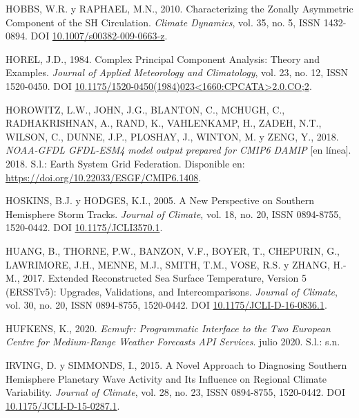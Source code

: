 \documentclass[12pt,oneside,a4paper]{reedthesis}
\newlength{\cslhangindent}
\newenvironment{CSLReferences}[2] %
 {%
  \setlength{\parindent}{0pt}
  \ifodd #1 \everypar{\setlength{\hangindent}{\cslhangindent}}\ignorespaces\fi
  \ifnum #2 > 0
  \setlength{\parskip}{#2\baselineskip}
  \fi
 }%
 {}
\begin{document}
\begin{CSLReferences}{1}{0}
\leavevmode{}%
HOBBS, W.R. y RAPHAEL, M.N., 2010. Characterizing the Zonally Asymmetric Component of the {SH} Circulation. \emph{Climate Dynamics}, vol. 35, no. 5, ISSN 1432-0894. DOI \href{https://doi.org/10.1007/s00382-009-0663-z}{10.1007/s00382-009-0663-z}.

\leavevmode{}%
HOREL, J.D., 1984. Complex {Principal Component Analysis}: {Theory} and {Examples}. \emph{Journal of Applied Meteorology and Climatology}, vol. 23, no. 12, ISSN 1520-0450. DOI \href{https://doi.org/10.1175/1520-0450(1984)023\%3C1660:CPCATA\%3E2.0.CO;2}{10.1175/1520-0450(1984)023\textless1660:CPCATA\textgreater2.0.CO;2}.

\leavevmode{}%
HOROWITZ, L.W., JOHN, J.G., BLANTON, C., MCHUGH, C., RADHAKRISHNAN, A., RAND, K., VAHLENKAMP, H., ZADEH, N.T., WILSON, C., DUNNE, J.P., PLOSHAY, J., WINTON, M. y ZENG, Y., 2018. \emph{NOAA-GFDL GFDL-ESM4 model output prepared for CMIP6 DAMIP} {[}en línea{]}. 2018. S.l.: Earth System Grid Federation. Disponible en: \url{https://doi.org/10.22033/ESGF/CMIP6.1408}.

\leavevmode{}%
HOSKINS, B.J. y HODGES, K.I., 2005. A {New Perspective} on {Southern Hemisphere Storm Tracks}. \emph{Journal of Climate}, vol. 18, no. 20, ISSN 0894-8755, 1520-0442. DOI \href{https://doi.org/10.1175/JCLI3570.1}{10.1175/JCLI3570.1}.

\leavevmode{}%
HUANG, B., THORNE, P.W., BANZON, V.F., BOYER, T., CHEPURIN, G., LAWRIMORE, J.H., MENNE, M.J., SMITH, T.M., VOSE, R.S. y ZHANG, H.-M., 2017. Extended {Reconstructed Sea Surface Temperature}, {Version} 5 ({ERSSTv5}): {Upgrades}, {Validations}, and {Intercomparisons}. \emph{Journal of Climate}, vol. 30, no. 20, ISSN 0894-8755, 1520-0442. DOI \href{https://doi.org/10.1175/JCLI-D-16-0836.1}{10.1175/JCLI-D-16-0836.1}.

\leavevmode{}%
HUFKENS, K., 2020. \emph{Ecmwfr: {Programmatic} Interface to the Two {European Centre} for {Medium-Range Weather Forecasts API} Services}. julio 2020. S.l.: s.n.

\leavevmode{}%
IRVING, D. y SIMMONDS, I., 2015. A {Novel Approach} to {Diagnosing Southern Hemisphere Planetary Wave Activity} and {Its Influence} on {Regional Climate Variability}. \emph{Journal of Climate}, vol. 28, no. 23, ISSN 0894-8755, 1520-0442. DOI \href{https://doi.org/10.1175/JCLI-D-15-0287.1}{10.1175/JCLI-D-15-0287.1}.


\end{CSLReferences}
\end{document}
